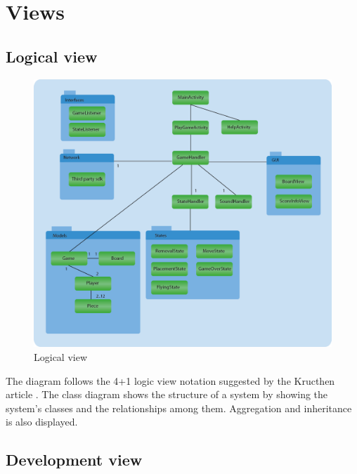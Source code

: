
\pagebreak

\section{Views}

\subsection{Logical view}


\begin{figure}[H]
\begin{center}
\includegraphics[width=\textwidth]{./Images/LogicalView.png}
\end{center}
\caption{Logical view}
\end{figure}

The diagram follows the 4+1 logic view notation suggested by the Kructhen article \cite{krutchen}. The class diagram shows the structure of a system by showing the system's classes  and the relationships among them. Aggregation and inheritance is also displayed.

\subsection{Development view}

